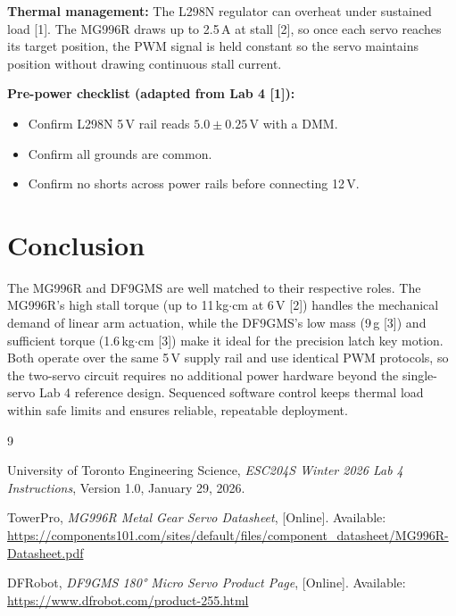 \documentclass[12pt, letterpaper]{article}
\begin{document}
\textbf{Thermal management:} The L298N regulator can overheat under sustained load [1].
The MG996R draws up to 2.5\,A at stall [2], so once each servo reaches its target position,
the PWM signal is held constant so the servo maintains position without drawing continuous
stall current.

\textbf{Pre-power checklist (adapted from Lab 4 [1]):}
\begin{itemize}
    \item Confirm L298N 5\,V rail reads $5.0 \pm 0.25$\,V with a DMM.
    \item Confirm all grounds are common.
    \item Confirm no shorts across power rails before connecting 12\,V.
\end{itemize}

\section{Conclusion}

The MG996R and DF9GMS are well matched to their respective roles. The MG996R's high stall
torque (up to 11\,kg$\cdot$cm at 6\,V [2]) handles the mechanical demand of linear arm
actuation, while the DF9GMS's low mass (9\,g [3]) and sufficient torque (1.6\,kg$\cdot$cm
[3]) make it ideal for the precision latch key motion. Both operate over the same 5\,V
supply rail and use identical PWM protocols, so the two-servo circuit requires no additional
power hardware beyond the single-servo Lab 4 reference design. Sequenced software control
keeps thermal load within safe limits and ensures reliable, repeatable deployment.


\newpage
\begin{thebibliography}{9}

University of Toronto Engineering Science,
\textit{ESC204S Winter 2026 Lab 4 Instructions},
Version 1.0, January 29, 2026.

TowerPro,
\textit{MG996R Metal Gear Servo Datasheet},
[Online]. Available: \url{https://components101.com/sites/default/files/component_datasheet/MG996R-Datasheet.pdf}

DFRobot,
\textit{DF9GMS 180° Micro Servo Product Page},
[Online]. Available: \url{https://www.dfrobot.com/product-255.html}

\end{thebibliography}
\end{document}
